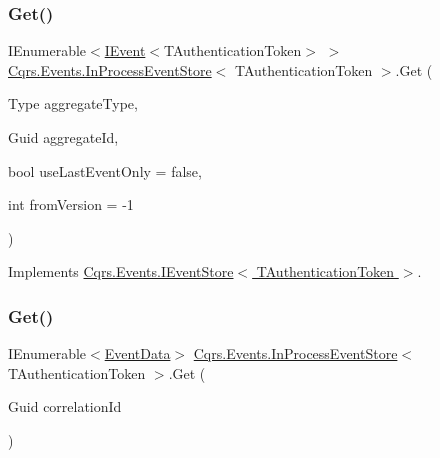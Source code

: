 \subsubsection{\texorpdfstring{Get()}{Get()}\hspace{0.1cm}{\footnotesize\ttfamily [1/2]}}
{\footnotesize\ttfamily I\+Enumerable$<$\hyperlink{interfaceCqrs_1_1Events_1_1IEvent}{I\+Event}$<$T\+Authentication\+Token$>$ $>$ \hyperlink{classCqrs_1_1Events_1_1InProcessEventStore}{Cqrs.\+Events.\+In\+Process\+Event\+Store}$<$ T\+Authentication\+Token $>$.Get (\begin{DoxyParamCaption}\item[{Type}]{aggregate\+Type,  }\item[{Guid}]{aggregate\+Id,  }\item[{bool}]{use\+Last\+Event\+Only = {\ttfamily false},  }\item[{int}]{from\+Version = {\ttfamily -\/1} }\end{DoxyParamCaption})}



Implements \hyperlink{interfaceCqrs_1_1Events_1_1IEventStore_ae02ef6c804d0c4a92705a447bc4b2214_ae02ef6c804d0c4a92705a447bc4b2214}{Cqrs.\+Events.\+I\+Event\+Store$<$ T\+Authentication\+Token $>$}.

\mbox{\label{classCqrs_1_1Events_1_1InProcessEventStore_aeff2bd8064eb4a1501d723e2aa9f8cfd_aeff2bd8064eb4a1501d723e2aa9f8cfd}} 
\subsubsection{\texorpdfstring{Get()}{Get()}\hspace{0.1cm}{\footnotesize\ttfamily [2/2]}}
{\footnotesize\ttfamily I\+Enumerable$<$\hyperlink{classCqrs_1_1Events_1_1EventData}{Event\+Data}$>$ \hyperlink{classCqrs_1_1Events_1_1InProcessEventStore}{Cqrs.\+Events.\+In\+Process\+Event\+Store}$<$ T\+Authentication\+Token $>$.Get (\begin{DoxyParamCaption}\item[{Guid}]{correlation\+Id }\end{DoxyParamCaption})}



